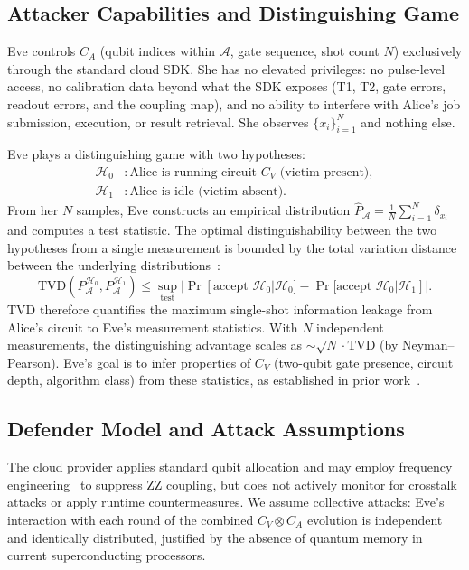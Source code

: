 \documentclass[ASNA,twocolumn]{USG}
\begin{document}
\subsection{Attacker Capabilities and Distinguishing Game}

Eve controls $C_A$ (qubit indices within $\mathcal{A}$, gate sequence, shot count $N$) exclusively through the standard cloud SDK. She has no elevated privileges: no pulse-level access, no calibration data beyond what the SDK exposes (T1, T2, gate errors, readout errors, and the coupling map), and no ability to interfere with Alice's job submission, execution, or result retrieval. She observes $\{x_i\}_{i=1}^N$ and nothing else.

Eve plays a distinguishing game with two hypotheses:
\begin{align}
    \mathcal{H}_0 &: \text{Alice is running circuit } C_V \text{ (victim present)}, \\
    \mathcal{H}_1 &: \text{Alice is idle (victim absent)}.
\end{align}
From her $N$ samples, Eve constructs an empirical distribution $\hat{P}_{\mathcal{A}} = \frac{1}{N}\sum_{i=1}^N \delta_{x_i}$ and computes a test statistic. The optimal distinguishability between the two hypotheses from a single measurement is bounded by the total variation distance between the underlying distributions~\cite{preskill2018nisq}:
\begin{equation}
    \mathrm{TVD}(P_{\mathcal{A}}^{\mathcal{H}_0}, P_{\mathcal{A}}^{\mathcal{H}_1}) \leq \sup_{\text{test}} |\Pr[\text{accept } \mathcal{H}_0|\mathcal{H}_0] - \Pr[\text{accept } \mathcal{H}_0|\mathcal{H}_1]|.
\end{equation}
TVD therefore quantifies the maximum single-shot information leakage from Alice's circuit to Eve's measurement statistics. With $N$ independent measurements, the distinguishing advantage scales as $\sim \sqrt{N} \cdot \mathrm{TVD}$ (by Neyman--Pearson). Eve's goal is to infer properties of $C_V$ (two-qubit gate presence, circuit depth, algorithm class) from these statistics, as established in prior work~\cite{hu2025swap,choudhury2024crosstalk}.

\subsection{Defender Model and Attack Assumptions}

The cloud provider applies standard qubit allocation and may employ frequency engineering~\cite{ding2020crosstalk,osman2023mitigation} to suppress ZZ coupling, but does not actively monitor for crosstalk attacks or apply runtime countermeasures. We assume collective attacks: Eve's interaction with each round of the combined $C_V \otimes C_A$ evolution is independent and identically distributed, justified by the absence of quantum memory in current superconducting processors.
\end{document}
